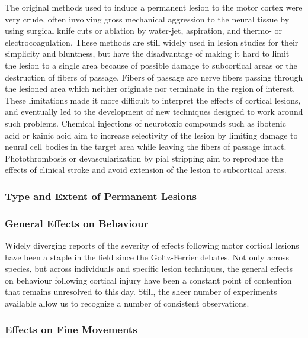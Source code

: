 The original methods used to induce a permanent lesion to the motor cortex were very crude, often involving gross mechanical aggression to the neural tissue by using surgical knife cuts or ablation by water-jet, aspiration, and thermo- or electrocoagulation. These methods are still widely used in lesion studies for their simplicity and bluntness, but have the disadvantage of making it hard to limit the lesion to a single area because of possible damage to subcortical areas or the destruction of fibers of passage. Fibers of passage are nerve fibers passing through the lesioned area which neither originate nor terminate in the region of interest. These limitations made it more difficult to interpret the effects of cortical lesions, and eventually led to the development of new techniques designed to work around such problems. Chemical injections of neurotoxic compounds such as ibotenic acid or kainic acid aim to increase selectivity of the lesion by limiting damage to neural cell bodies in the target area while leaving the fibers of passage intact. Photothrombosis or devascularization by pial stripping aim to reproduce the effects of clinical stroke and avoid extension of the lesion to subcortical areas.

\subsubsection{Type and Extent of Permanent Lesions}

\subsubsection{General Effects on Behaviour}

Widely diverging reports of the severity of effects following motor cortical lesions have been a staple in the field since the Goltz-Ferrier debates. Not only across species, but across individuals and specific lesion techniques, the general effects on behaviour following cortical injury have been a constant point of contention that remains unresolved to this day. Still, the sheer number of experiments available allow us to recognize a number of consistent observations.

\subsubsection{Effects on Fine Movements}

